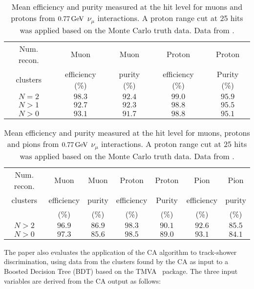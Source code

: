 \begin{table}
\centering
\begin{tabular}{*{5}{c}}
Num. recon. & Muon             & Muon        & Proton          & Proton      \\
clusters    & efficiency (\%)  & purity (\%) & efficiency (\%) & Purity (\%) \\
\hline
\hline
$N = 2$ & $98.3$ & $92.4$ & $99.0$ & $95.9$ \\
$N > 1$ & $92.7$ & $92.3$ & $98.8$ & $95.5$ \\
$N > 0$ & $93.1$ & $91.7$ & $98.8$ & $95.1$ \\
\hline
\end{tabular}
\caption[CCQE reconstruction efficiency]{\label{table:ccqe-recon-efficiency-further-work}Mean efficiency and purity measured at the hit level for muons and protons from $0.77\,\mathrm{GeV}$ $\nu_\mu$ interactions. A proton range cut at 25 hits was applied based on the Monte Carlo truth data. Data from \cite{Back2013}.}
\end{table}

\begin{table}
\centering
\begin{tabular}{*{7}{c}}
Num. recon. & Muon        & Muon     & Proton          & Proton      & Pion            & Pion \\
clusters    & efficiency  & purity   & efficiency      & Purity      & efficiency      & purity      \\
            & (\%)        &     (\%) &            (\%) &        (\%) &            (\%) &        (\%) \\
\hline
\hline
$N > 2$ & $96.9$ & $86.9$ & $98.3$ & $90.1$ & $92.6$ & $85.5$ \\
$N > 0$ & $97.3$ & $85.6$ & $98.5$ & $89.0$ & $93.1$ & $84.1$ \\
\hline
\end{tabular}
\caption[$\CCPI$ reconstruction efficiency]{\label{table:ccpi-recon-efficiency-further-work}Mean efficiency and purity measured at the hit level for muons, protons and pions from $0.77\,\mathrm{GeV}$ $\nu_\mu$ interactions. A proton range cut at 25 hits was applied based on the Monte Carlo truth data. Data from \citep{Back2013}.}
\end{table}

The paper also evaluates the application of the CA algorithm to track-shower discrimination, using data from the clusters found by the CA as input to a Boosted Decision Tree (BDT) based on the TMVA~\citep{TMVA} package. The three input variables are derived from the CA output as follows:

